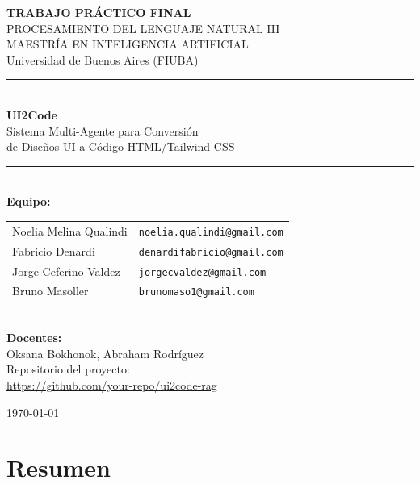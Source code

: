 \documentclass[12pt,a4paper]{article}
\begin{document}
\begin{titlepage}
    \centering
    \vspace*{2cm}
    
    {\LARGE\bfseries TRABAJO PRÁCTICO FINAL\\[0.5cm]}
    {\Large PROCESAMIENTO DEL LENGUAJE NATURAL III\\[0.3cm]}
    {\large MAESTRÍA EN INTELIGENCIA ARTIFICIAL\\[0.2cm]}
    {\large Universidad de Buenos Aires (FIUBA)\\[2cm]}
    
    \rule{\textwidth}{1.5pt}\\[0.4cm]
    {\Huge\bfseries UI2Code\\[0.2cm]}
    {\LARGE Sistema Multi-Agente para Conversión\\[0.1cm] de Diseños UI a Código HTML/Tailwind CSS\\[0.4cm]}
    \rule{\textwidth}{1.5pt}\\[2cm]
    
    {\large\bfseries Equipo:\\[0.3cm]}
    \begin{tabular}{ll}
        Noelia Melina Qualindi & \texttt{noelia.qualindi@gmail.com} \\
        Fabricio Denardi & \texttt{denardifabricio@gmail.com} \\
        Jorge Ceferino Valdez & \texttt{jorgecvaldez@gmail.com} \\
        Bruno Masoller & \texttt{brunomaso1@gmail.com}
    \end{tabular}\\[1cm]
    
    {\large\bfseries Docentes:\\[0.3cm]}
    Oksana Bokhonok, Abraham Rodríguez\\[2cm]
    
    {\large Repositorio del proyecto:\\[0.2cm]}
    \url{https://github.com/your-repo/ui2code-rag}\\[1cm]
    
    \vfill
    
    {\large \today}
\end{titlepage}

\newpage
\tableofcontents
\newpage

\section{Resumen}
\end{document}
